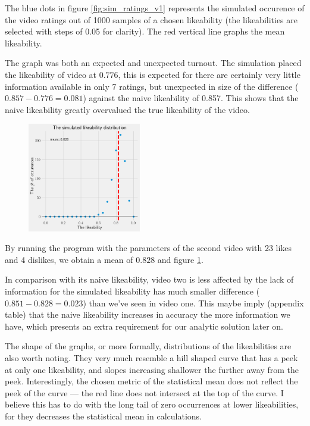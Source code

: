 \documentclass[a4paper,11pt]{article}
\begin{document}
The blue dots in figure \ref{fig:sim_ratings_v1} represents the simulated occurence of the video ratings out of 1000 samples of a chosen likeability (the likeabilities are selected with steps of 0.05 for clarity). The red vertical line graphs the mean likeability.

The graph was both an expected and unexpected turnout. The simulation placed the likeability of video at $0.776$, this is expected for there are certainly very little information available in only 7 ratings, but unexpected in size of the difference ($0.857-0.776=0.081$) against the naive likeability of 0.857. This shows that the naive likeability greatly overvalued the true likeability of the video.

\begin{figure}
    \includegraphics[width=0.44\textwidth,right]{assets/sim_ratings_v2.png}
    \caption{}
    \label{fig:sim_ratings_v2}
\end{figure}


By running the program with the parameters of the second video with 23 likes and 4 dislikes,
we obtain a mean of $0.828$ and figure \ref{fig:sim_ratings_v2}.

In comparison with its naive likeability, video two is less affected by the lack of information for the simulated likeability has much smaller difference ($0.851-0.828=0.023$) than we've seen in video one. This maybe imply (appendix table) that the naive likeability increases in accuracy the more information we have, which presents an extra requirement for our analytic solution later on.

The shape of the graphs, or more formally, distributions of the likeabilities are also worth noting. They very much resemble a hill shaped curve that has a peek at only one likeability, and slopes increasing shallower the further away from the peek. Interestingly, the chosen metric of the statistical mean does not reflect the peek of the curve --- the red line does not intersect at the top of the curve. I believe this has to do with the long tail of zero occurrences at lower likeabilities, for they decreases the statistical mean in calculations.
\end{document}
